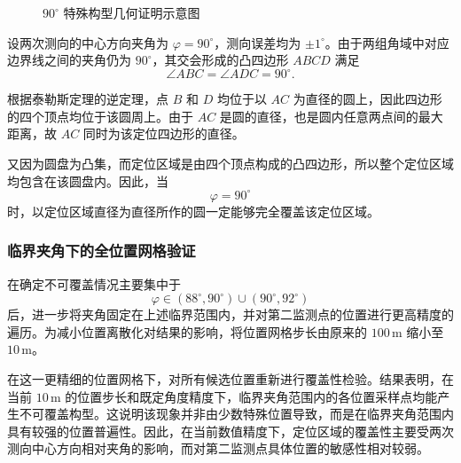 \documentclass[withoutpreface,bwprint]{cumcmthesis}
\begin{document}
\begin{figure}[htbp]

    \caption{$90^\circ$ 特殊构型几何证明示意图}
    \label{fig:90-degree-configuration}
\end{figure}
设两次测向的中心方向夹角为 $\varphi=90^\circ$，测向误差均为 $\pm1^\circ$。由于两组角域中对应边界线之间的夹角仍为 $90^\circ$，其交会形成的凸四边形 $ABCD$ 满足
\[
\angle ABC=\angle ADC=90^\circ.
\]

根据泰勒斯定理的逆定理，点 $B$ 和 $D$ 均位于以 $AC$ 为直径的圆上，因此四边形的四个顶点均位于该圆周上。由于 $AC$ 是圆的直径，也是圆内任意两点间的最大距离，故 $AC$ 同时为该定位四边形的直径。

又因为圆盘为凸集，而定位区域是由四个顶点构成的凸四边形，所以整个定位区域均包含在该圆盘内。因此，当
\[
\varphi=90^\circ
\]
时，以定位区域直径为直径所作的圆一定能够完全覆盖该定位区域。

\subsubsection{临界夹角下的全位置网格验证}
在确定不可覆盖情况主要集中于
\[
\varphi\in(88^\circ,90^\circ)\cup(90^\circ,92^\circ)
\]
后，进一步将夹角固定在上述临界范围内，并对第二监测点的位置进行更高精度的遍历。为减小位置离散化对结果的影响，将位置网格步长由原来的 $100\,\mathrm{m}$ 缩小至
\(10\,\mathrm{m}\)。


在这一更精细的位置网格下，对所有候选位置重新进行覆盖性检验。结果表明，在当前 $10\,\mathrm{m}$ 的位置步长和既定角度精度下，临界夹角范围内的各位置采样点均能产生不可覆盖构型。这说明该现象并非由少数特殊位置导致，而是在临界夹角范围内具有较强的位置普遍性。因此，在当前数值精度下，定位区域的覆盖性主要受两次测向中心方向相对夹角的影响，而对第二监测点具体位置的敏感性相对较弱。
\end{document}
